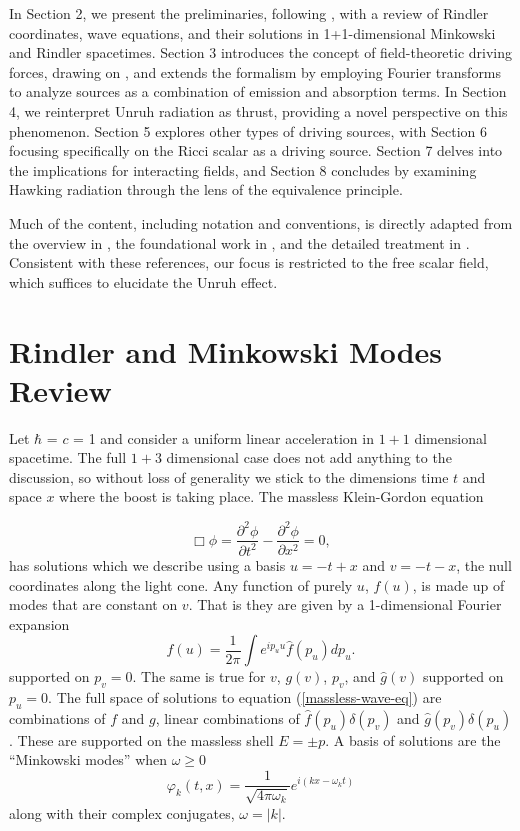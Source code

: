 \documentclass[12pt,a4paper]{article}
\begin{document}
In Section 2, we present the preliminaries, following \cite{Frodden}, with a review of Rindler coordinates, wave equations, and their solutions in 1+1-dimensional Minkowski and Rindler spacetimes. Section 3 introduces the concept of field-theoretic driving forces, drawing on \cite{beisert}, and extends the formalism by employing Fourier transforms to analyze sources as a combination of emission and absorption terms. In Section 4, we reinterpret Unruh radiation as thrust, providing a novel perspective on this phenomenon. Section 5 explores other types of driving sources, with Section 6 focusing specifically on the Ricci scalar as a driving source. Section 7 delves into the implications for interacting fields, and Section 8 concludes by examining Hawking radiation through the lens of the equivalence principle.


Much of the content, including notation and conventions, is directly adapted from the overview in \cite{Frodden}, the foundational work in \cite{unruh}, and the detailed treatment in \cite{beisert}. Consistent with these references, our focus is restricted to the free scalar field, which suffices to elucidate the Unruh effect.

\section{Rindler and Minkowski Modes Review}

Let $\hbar$ = $c$ = 1 and consider a uniform linear acceleration in $1+1$ dimensional spacetime. The full $1+3$ dimensional case does not add anything to the discussion, so without loss of generality we stick to the dimensions time $t$ and space $x$ where the boost is taking place.  The massless Klein-Gordon equation 

\begin{equation}
  \Box \phi = \frac{\partial^2 \phi}{\partial t^2} - \frac{\partial^2 \phi}{\partial x^2} = 0,
 \label{massless-wave-eq}
\end{equation}
has solutions which we describe using a basis  $u = -t + x$ and $v = -t - x$, the null coordinates along the light cone.  Any function of purely $u$, $f(u)$, is made up of modes that are constant on $v$.  That is they are given by a 1-dimensional Fourier expansion
\begin{equation}
  f(u) = \frac{1}{2\pi} \int{e^{i p_u u} \hat{f}(p_u) dp_u}.
\end{equation}
supported on $p_v = 0$.  The same is true for $v$, $g(v)$, $p_v$, and $\hat{g}(v)$ supported on $p_u = 0$.  The full space of solutions to equation (\ref{massless-wave-eq}) are combinations of $f$ and $g$, linear combinations of $\hat{f}(p_u) \delta(p_v)$ and $\hat{g}(p_v) \delta(p_u)$.  These are supported on the massless shell $E = \pm p$.  A basis of solutions are the ``Minkowski modes'' when $\omega \ge 0$
\begin{equation}
  \varphi_k(t,x) = \frac{1}{\sqrt{4 \pi \omega_k}} e^{i(k x - \omega_k t)}
\end{equation}
along with their complex conjugates, $\omega = |k|$.
\end{document}
